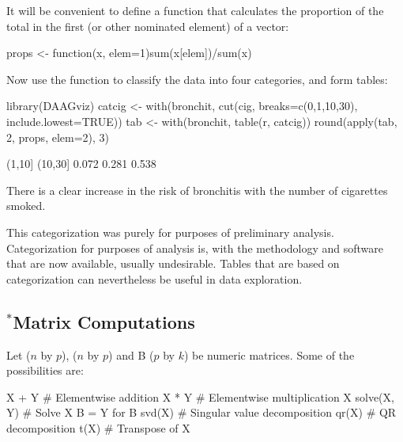 It will be convenient to define a function  that
calculates the proportion of the total in the first (or other nominated
element) of a vector:
\begin{Schunk}
\begin{Sinput}
props <- function(x, elem=1)sum(x[elem])/sum(x)
\end{Sinput}
\end{Schunk}
Now use the function  to classify the data into four
categories, and form tables:
\pagebreak
{}  
\begin{Schunk}
\begin{Sinput}
library(DAAGviz)
catcig <- with(bronchit,
               cut(cig, breaks=c(0,1,10,30),
                   include.lowest=TRUE))
tab <- with(bronchit, table(r, catcig))
round(apply(tab, 2, props, elem=2), 3)
\end{Sinput}
\begin{Soutput}
  [0,1]  (1,10] (10,30] 
  0.072   0.281   0.538 
\end{Soutput}
\end{Schunk}
\noindent
There is a clear increase in the risk of bronchitis with the number
of cigarettes smoked.

This categorization was purely for  purposes of
preliminary analysis.  Categorization for purposes of analysis is,
with the methodology and software that are now available, usually
undesirable. Tables that are based on categorization can nevertheless
be useful in data exploration.

\subsection{$^*$Matrix Computations}
Let  ($n$ by $p$),  ($n$ by $p$) and B ($p$ by $k$) be
numeric matrices. Some of the possibilities are:
\begin{Schunk}
\begin{Sinput}
X + Y             # Elementwise addition
X * Y             # Elementwise multiplication
X %*% B           # Matrix multiplication
solve(X, Y)       # Solve X B = Y for B
svd(X)            # Singular value decomposition
qr(X)             # QR decomposition
t(X)              # Transpose of X
\end{Sinput}
\end{Schunk}

